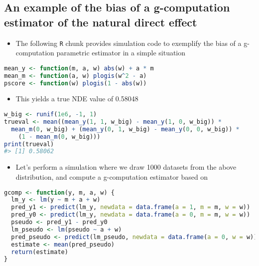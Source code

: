 \documentclass[
  12pt,
]{book}
\newcommand{\passthrough}[1]{#1}
\providecommand{\tightlist}{%
  \setlength{\itemsep}{0pt}\setlength{\parskip}{0pt}}
\theoremstyle{definition}
\theoremstyle{definition}
\theoremstyle{definition}
\newcommand{\1}{\mathbbm{1}}
\begin{document}
\hypertarget{an-example-of-the-bias-of-a-g-computation-estimator-of-the-natural-direct-effect}{%
\subsection{An example of the bias of a g-computation estimator of the natural direct effect}\label{an-example-of-the-bias-of-a-g-computation-estimator-of-the-natural-direct-effect}}

\begin{itemize}
\tightlist
\item
  The following \passthrough{\lstinline!R!} chunk provides simulation code to exemplify the bias of a
  g-computation parametric estimator in a simple situation
\end{itemize}

\begin{lstlisting}[language=R]
mean_y <- function(m, a, w) abs(w) + a * m
mean_m <- function(a, w) plogis(w^2 - a)
pscore <- function(w) plogis(1 - abs(w))
\end{lstlisting}

\begin{itemize}
\tightlist
\item
  This yields a true NDE value of 0.58048
\end{itemize}

\begin{lstlisting}[language=R]
w_big <- runif(1e6, -1, 1)
trueval <- mean((mean_y(1, 1, w_big) - mean_y(1, 0, w_big)) *
  mean_m(0, w_big) + (mean_y(0, 1, w_big) - mean_y(0, 0, w_big)) *
    (1 - mean_m(0, w_big)))
print(trueval)
#> [1] 0.58062
\end{lstlisting}

\begin{itemize}
\tightlist
\item
  Let's perform a simulation where we draw 1000 datasets from the above
  distribution, and compute a g-computation estimator based on
\end{itemize}

\begin{lstlisting}[language=R]
gcomp <- function(y, m, a, w) {
  lm_y <- lm(y ~ m + a + w)
  pred_y1 <- predict(lm_y, newdata = data.frame(a = 1, m = m, w = w))
  pred_y0 <- predict(lm_y, newdata = data.frame(a = 0, m = m, w = w))
  pseudo <- pred_y1 - pred_y0
  lm_pseudo <- lm(pseudo ~ a + w)
  pred_pseudo <- predict(lm_pseudo, newdata = data.frame(a = 0, w = w))
  estimate <- mean(pred_pseudo)
  return(estimate)
}
\end{lstlisting}
\end{document}
